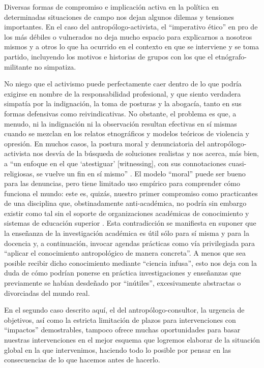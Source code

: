 \documentclass[
  spanish,
  11pt,
  a4paper,
]{scrbook}
\begin{document}

Diversas formas de compromiso e implicación activa en la política en
determinadas situaciones de campo nos dejan algunos dilemas y tensiones
importantes. En el caso del antropólogo-activista, el ``imperativo
ético'' en pro de los más débiles o vulnerados no deja mucho espacio
para explicarnos a nosotros mismos y a otros lo que ha ocurrido en el
contexto en que se interviene y se toma partido, incluyendo los motivos
e historias de grupos con los que el etnógrafo-militante no simpatiza.

No niego que el activismo puede perfectamente caer dentro de lo que
podría exigirse en nombre de la responsabilidad profesional, y que
siento verdadera simpatía por la indignación, la toma de posturas y la
abogacía, tanto en sus formas defensivas como reivindicativas. No
obstante, el problema es que, a menudo, ni la indignación ni la
observación resultan efectivas en sí mismas cuando se mezclan en los
relatos etnográficos y modelos teóricos de violencia y opresión. En
muchos casos, la postura moral y denunciatoria del antropólogo-activista
nos desvía de la búsqueda de soluciones realistas y nos acerca, más
bien, a ``un enfoque en el que `atestiguar' {[}witnessing{]}, con sus
connotaciones cuasi-religiosas, se vuelve un fin en sí mismo''
\autocite[435]{DAndrade1995}. El modelo ``moral'' puede ser bueno para
las denuncias, pero tiene limitado uso empírico para comprender cómo
funciona el mundo: este es, quizás, nuestro primer compromiso como
practicantes de una disciplina que, obstinadamente anti-académica, no
podría sin embargo existir como tal sin el soporte de organizaciones
académicas de conocimiento y sistemas de educación superior
\autocite[1-2]{Ingold1996}. Esta contradicción se manifiesta en suponer
que la enseñanza de la investigación académica es útil sólo para sí
misma y para la docencia \autocite[138]{VazquezMellado2012} y, a
continuación, invocar agendas prácticas como vía privilegiada para
``aplicar el conocimiento antropológico de manera concreta''. A menos
que sea posible recibir dicho conocimiento mediante ``ciencia infusa'',
esto nos deja con la duda de cómo podrían ponerse en práctica
investigaciones y enseñanzas que previamente se habían desdeñado por
``inútiles'', excesivamente abstractas o divorciadas del mundo real.

En el segundo caso descrito aquí, el del antropólogo-consultor, la
urgencia de objetivos, así como la estricta limitación de plazos para
intervenciones con ``impactos'' demostrables, tampoco ofrece muchas
oportunidades para basar nuestras intervenciones en el mejor esquema que
logremos elaborar de la situación global en la que intervenimos,
haciendo todo lo posible por pensar en las consecuencias de lo que
hacemos antes de hacerlo.
\end{document}
